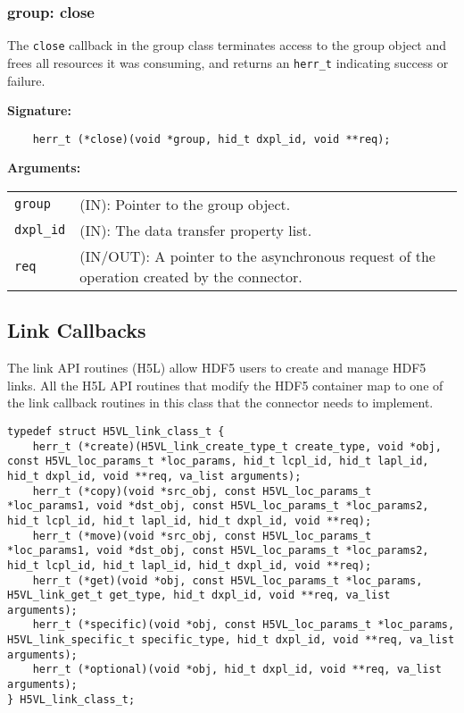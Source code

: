 \subsubsection{group: close}
The \texttt{close} callback in the group class terminates access to
the group object and frees all resources it was consuming, and returns
an \texttt{herr\_t} indicating success or failure.\bigskip

\begin{mdframed}[style=bgbox]
\textbf{Signature:}
\begin{lstlisting}
    herr_t (*close)(void *group, hid_t dxpl_id, void **req);
\end{lstlisting}

\textbf{Arguments:}\\
\begin{tabular}{l p{13.5cm}}
  \texttt{group} & (IN): Pointer to the group object.\\
  \texttt{dxpl\_id} & (IN): The data transfer property list.\\
  \texttt{req} & (IN/OUT): A pointer to the asynchronous request of the
  operation created by the connector.\\
\end{tabular}
\end{mdframed}


\subsection{Link Callbacks}
The link API routines (H5L) allow HDF5 users to create and manage
HDF5 links. All the H5L API routines that modify the HDF5 container
map to one of the link callback routines in this class that the
connector needs to implement.

\begin{lstlisting}[caption={Structure for link callback routines, H5VLconnector.h}, captionpos=b, label={lst:H5Lclass}]
typedef struct H5VL_link_class_t {                                               
    herr_t (*create)(H5VL_link_create_type_t create_type, void *obj, const H5VL_loc_params_t *loc_params, hid_t lcpl_id, hid_t lapl_id, hid_t dxpl_id, void **req, va_list arguments);
    herr_t (*copy)(void *src_obj, const H5VL_loc_params_t *loc_params1, void *dst_obj, const H5VL_loc_params_t *loc_params2, hid_t lcpl_id, hid_t lapl_id, hid_t dxpl_id, void **req);           
    herr_t (*move)(void *src_obj, const H5VL_loc_params_t *loc_params1, void *dst_obj, const H5VL_loc_params_t *loc_params2, hid_t lcpl_id, hid_t lapl_id, hid_t dxpl_id, void **req);           
    herr_t (*get)(void *obj, const H5VL_loc_params_t *loc_params, H5VL_link_get_t get_type, hid_t dxpl_id, void **req, va_list arguments);                 
    herr_t (*specific)(void *obj, const H5VL_loc_params_t *loc_params, H5VL_link_specific_t specific_type, hid_t dxpl_id, void **req, va_list arguments);            
    herr_t (*optional)(void *obj, hid_t dxpl_id, void **req, va_list arguments); 
} H5VL_link_class_t;   
\end{lstlisting}


